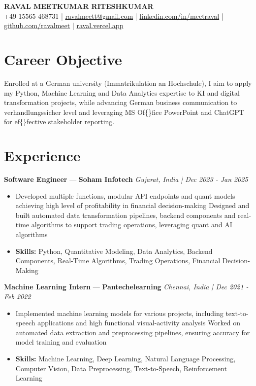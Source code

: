 \documentclass[a4paper,10pt]{article}
\begin{document}
\begin{center}
  {\Large\bfseries RAVAL MEETKUMAR RITESHKUMAR}\\[2pt]
  {\small +49 15565 468731 \;|\; \href{mailto:ravalmeett@gmail.com}{ravalmeett@gmail.com} \;|\; \href{https://www.linkedin.com/in/meetraval/}{linkedin.com/in/meetraval} \;|\; \href{https://github.com/ravalmeet}{github.com/ravalmeet} \;|\; \href{https://raval.vercel.app/}{raval.vercel.app}}
\end{center}
\vspace{-3pt}

\section*{Career Objective}
Enrolled at a German university (Immatrikulation an Hochschule), I aim to apply my Python, Machine Learning and Data Analytics expertise to KI and digital transformation projects, while advancing German business communication to verhandlungssicher level and leveraging MS Of\{\}fice PowerPoint and ChatGPT for ef\{\}fective stakeholder reporting.\par

\section*{Experience}
\textbf{Software Engineer} — \textbf{Soham Infotech} \hfill \textit{Gujarat, India \;|\; Dec 2023 - Jan 2025}\par
\vspace{1pt}
\begin{itemize}
  \item Developed multiple functions, modular API endpoints and quant models achieving high level of profitability in financial decision-making Designed and built automated data transformation pipelines, backend components and real-time algorithms to support trading operations, leveraging quant and AI algorithms
  \item \textbf{Skills:} Python, Quantitative Modeling, Data Analytics, Backend Components, Real-Time Algorithms, Trading Operations, Financial Decision-Making
\end{itemize}
\vspace{3pt}
\textbf{Machine Learning Intern} — \textbf{Pantechelearning} \hfill \textit{Chennai, India \;|\; Dec 2021 - Feb 2022}\par
\vspace{1pt}
\begin{itemize}
  \item Implemented machine learning models for various projects, including text-to-speech applications and high functional visual-activity analysis Worked on automated data extraction and preprocessing pipelines, ensuring accuracy for model training and evaluation
  \item \textbf{Skills:} Machine Learning, Deep Learning, Natural Language Processing, Computer Vision, Data Preprocessing, Text-to-Speech, Reinforcement Learning
\end{itemize}
\end{document}
